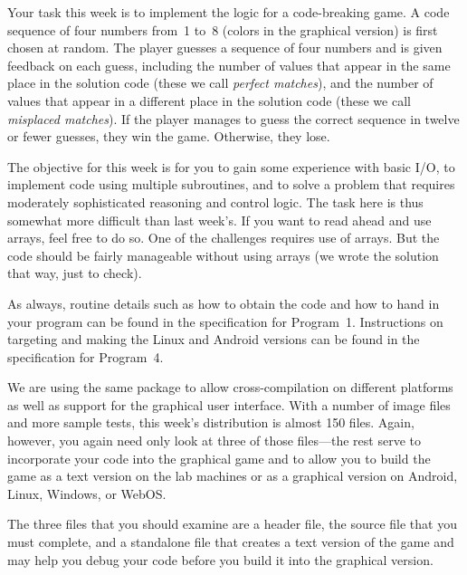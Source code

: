 



\bigskip
{}
\bigskip

Your task this week is to implement the logic for a code-breaking game.
A code sequence of four numbers from~1 to~8 (colors in the graphical version)
is first chosen at random.
The player guesses a sequence of four numbers and is given feedback on each 
guess, including the number of values that appear in the same place
in the solution code (these we call {\em perfect matches}), and the
number of values that appear in a different place in the solution
code (these we call {\em misplaced matches}).
If the player manages to guess the correct sequence in twelve or fewer
guesses, they win the game.  Otherwise, they lose.

The objective for this week is for you to gain some experience with 
basic I/O, to implement code using multiple subroutines,
and to solve a problem that requires moderately
sophisticated reasoning and control logic.
%
The task here is thus somewhat more difficult than last week's.  
If you want to read ahead and
use arrays, feel free to do so.  One of the challenges requires use of 
arrays.  But the code should be fairly manageable without using arrays
(we wrote the solution that way, just to check).


\begin{minipage}{3.35in}
As always, routine details such as how to obtain the code and how to
hand in your program can be found in the specification for 
Program~1.  Instructions on targeting and making the Linux and Android
versions can be found in the specification for Program~4.\\ \mpline


\mpline

We are using the same package to allow cross-compilation on different
platforms as well as support for the graphical user interface.  With
a number of image files and more sample tests, this week's distribution
is almost 150 files.  Again, however,  you again need only
look at three of those files---the rest serve to incorporate your
code into the graphical game and to allow you to build the game
as a text version on the lab machines or as a graphical version
on Android, Linux, Windows, or WebOS.\mpline

The three files that you should examine are a header file, the source
file that you must complete, and a standalone file that
creates a text version of the game and may help you debug your code 
before you build it into the graphical version.\mpline
\end{minipage}\hspace{.25in}%
\begin{minipage}{2.9in}
\end{minipage}

